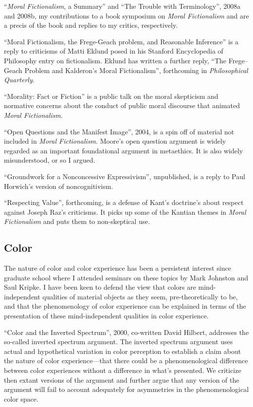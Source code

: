 \documentclass[contbibnum]{cv}
\begin{document}
``\emph{Moral Fictionalism}, a Summary'' and ``The Trouble with Terminology'', 2008a and 2008b, my contributions to a book symposium on \emph{Moral Fictionalism} and are a precis of the book and replies to my critics, respectively.

``Moral Fictionalism, the Frege-Geach problem, and Reasonable Inference'' is a reply to criticisms of Matti Eklund posed in his Stanford Encyclopedia of Philosophy entry on fictionalism. Eklund has written a further reply, ``The Frege--Geach Problem and Kalderon's Moral Fictionalism'', forthcoming in \emph{Philosophical Quarterly}.

``Morality: Fact or Fiction'' is a public talk on the moral skepticism and normative concerns about the conduct of public moral discourse that animated \emph{Moral Fictionalism}.

``Open Questions and the Manifest Image'', 2004, is a spin off of material not included in \emph{Moral Fictionalism}. Moore's open question argument is widely regarded as an important foundational argument in metaethics. It is also widely misunderstood, or so I argued.

``Groundwork for a Nonconcessive Expressivism'', unpublished, is a reply to Paul Horwich's version of noncognitivism. 

``Respecting Value'', forthcoming, is a defense of Kant's doctrine's about respect against Joseph Raz's criticisms. It picks up some of the Kantian themes in \emph{Moral Fictionalism} and puts them to non-skeptical use.




\subsection{Color}\label{sub:color} %

The nature of color and color experience has been a persistent interest since graduate school where I attended seminars on these topics by Mark Johnston and Saul Kripke. I have been keen to defend the view that colors are mind-independent qualities of material objects as they seem, pre-theoretically to be, and that the phenomenology of color experience can be explained in terms of the presentation of these mind-independent qualities in color experience. 

``Color and the Inverted Spectrum'', 2000, co-written David Hilbert, addresses the so-called inverted spectrum argument. The inverted spectrum argument uses actual and hypothetical variation in color perception to establish a claim about the nature of color experience---that there could be a phenomenological difference between color experiences without a difference in what's presented. We criticize then extant versions of the argument and further argue that any version of the argument will fail to account adequately for asymmetries in the phenomenological color space.
\end{document}
